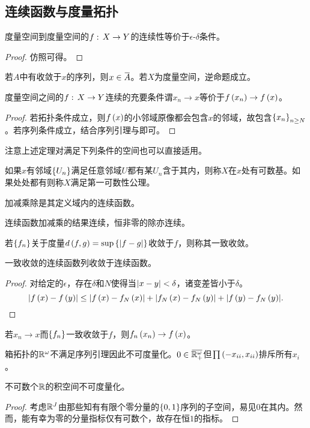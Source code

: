 \documentclass{ctexrep}
\begin{document}
  \subsection{连续函数与度量拓扑}
  \begin{theorem}
    度量空间到度量空间的$f:\, X \rightarrow Y$的连续性等价于$\epsilon$-$\delta$条件。
  \end{theorem}
  \begin{proof}
    仿照可得。
  \end{proof}
  \begin{lemma}[序列引理]
    若$A$中有收敛于$x$的序列，则$x\in\clo{A}$。若$X$为度量空间，逆命题成立。
  \end{lemma}
  \begin{theorem}
    度量空间之间的$f:\, X \rightarrow Y$连续的充要条件谓$x_n\rightarrow x$等价于$f\left(x_n\right)\rightarrow f\left(x\right)$。
  \end{theorem}
  \begin{proof}
    若拓扑条件成立，则$f\left(x\right)$的小邻域原像都会包含$x$的邻域，故包含$\left\{x_n\right\}_{n\ge N}$。若序列条件成立，结合序列引理与即可。
  \end{proof}
  注意上述定理对满足下列条件的空间也可以直接适用。
  \begin{definition}
    如果$x$有邻域$\left\{U_n\right\}$满足任意邻域$U$都有某$U_n$含于其内，则称$X$在$x$处有可数基。如果处处都有则称$X$满足第一可数性公理。
  \end{definition}
  \begin{lemma}
    加减乘除是其定义域内的连续函数。
  \end{lemma}
  \begin{theorem}
    连续函数加减乘的结果连续，恒非零的除亦连续。
  \end{theorem}
  \begin{definition}
    若$\left\{f_n\right\}$关于度量$d\left(f,g\right)=\sup\left\{\abs{f-g}\right\}$收敛于$f$，则称其一致收敛。
  \end{definition}
  \begin{theorem}
    一致收敛的连续函数列收敛于连续函数。
  \end{theorem}
  \begin{proof}
    对给定的$\epsilon$，存在$\delta$和$N$使得当$\abs{x-y}<\delta$，诸变差皆小于$\delta$。
    \[ \abs{f\left(x\right)-f\left(y\right)} \le \abs{f\left(x\right)-f_N\left(x\right)} +  \abs{f_N\left(x\right)-f_N\left(y\right)} +  \abs{f\left(y\right)-f_N\left(y\right)}.\qedhere\]
  \end{proof}
  \begin{collary}
    若$x_n\rightarrow x$而$\left\{f_n\right\}$一致收敛于$f$，则$f_n\left(x_n\right)\rightarrow f\left(x\right)$。
  \end{collary}
  \begin{ex}
    箱拓扑的$\mathbb{R}^\omega$不满足序列引理因此不可度量化。$0\in\clo{\R_+^\omega}$但$\prod\left(-x_{ii},x_{ii}\right)$排斥所有$x_i$。
  \end{ex}
  \begin{ex}
    不可数个$\mathbb{R}$的积空间不可度量化。
  \end{ex}
  \begin{proof}
    考虑$\mathbb{R}^J$由那些知有有限个零分量的$\left\{0,1\right\}$序列的子空间，易见$0$在其内。然而，能有幸为零的分量指标仅有可数个，故存在恒$1$的指标。
  \end{proof}
\end{document}
